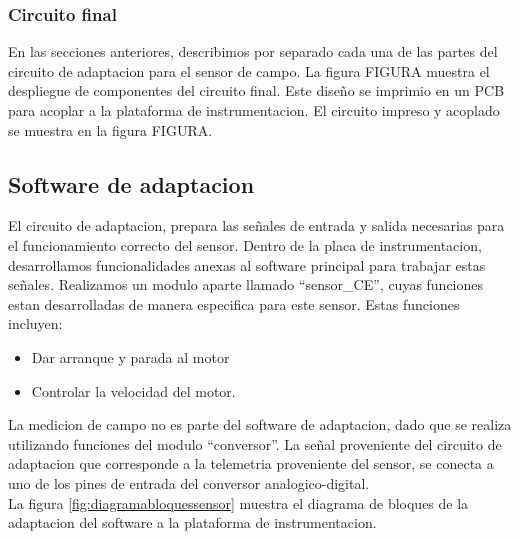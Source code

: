
\subsubsection{Circuito final} %
\label{ssub:circuito_final}

En las secciones anteriores, describimos por separado cada una de las partes del circuito de adaptacion para el sensor de campo. La figura FIGURA muestra el despliegue de componentes del circuito final. Este diseño se imprimio en un PCB para acoplar a la plataforma de instrumentacion. El circuito impreso y acoplado se muestra en la figura FIGURA.





\subsection{Software de adaptacion} %
\label{sec:software_de_adaptacion}


El circuito de adaptacion, prepara las señales de entrada y salida necesarias para el funcionamiento correcto del sensor. Dentro de la placa de instrumentacion, desarrollamos funcionalidades anexas al software principal para trabajar estas señales.
Realizamos un modulo aparte llamado ``sensor_CE'', cuyas funciones estan desarrolladas de manera especifica para este sensor. Estas funciones incluyen:

\begin{itemize}
	\item Dar arranque y parada al motor
	\item Controlar la velocidad del motor.
\end{itemize}

La medicion de campo no es parte del software de adaptacion, dado que se realiza utilizando funciones del modulo ``conversor''. La señal proveniente del circuito de adaptacion que corresponde a la telemetria proveniente del sensor, se conecta a uno de los pines de entrada del conversor analogico-digital. \\

La figura \ref{fig:diagramabloquessensor} muestra el diagrama de bloques de la adaptacion del software a la plataforma de instrumentacion.

